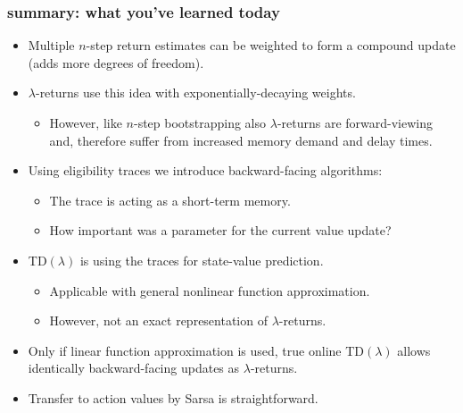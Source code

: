 \begin{frame}
\frametitle{summary: what you've learned today}
\begin{itemize}
	\item Multiple $n$-step return estimates can be weighted to form a compound update (adds more degrees of freedom).\pause
	\item $\lambda$-returns use this idea with exponentially-decaying weights.
	\begin{itemize}
		\item However, like $n$-step bootstrapping also $\lambda$-returns are forward-viewing and, therefore suffer from increased memory demand and delay times.
	\end{itemize}\pause
	\item Using eligibility traces we introduce backward-facing algorithms:
		\begin{itemize}
			\item The trace is acting as a short-term memory.
			\item How important was a parameter for the current value update? 
		\end{itemize}\pause
	\item TD$(\lambda)$	is using the traces for state-value prediction.
	\begin{itemize}
		\item Applicable with general nonlinear function approximation.
		\item However, not an exact representation of $\lambda$-returns.
	\end{itemize}\pause
	\item Only if linear function approximation is used, true online TD$(\lambda)$ allows identically backward-facing updates as $\lambda$-returns. \pause
	\item Transfer to action values by Sarsa is straightforward.
\end{itemize}
\end{frame}